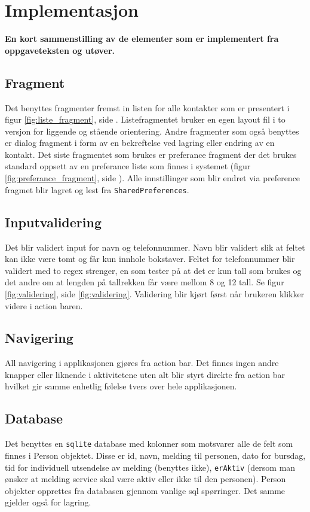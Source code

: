 \chapter{Implementasjon}

\textbf{En kort sammenstilling av de elementer som er implementert fra oppgaveteksten og utøver.}

\section{Fragment}
Det benyttes fragmenter fremst in listen for alle kontakter som er presentert i figur \ref{fig:liste_fragment}, side \pageref{fig:liste_fragment}. Listefragmentet bruker en egen layout fil i to versjon for liggende og stående orientering.
Andre fragmenter som også benyttes er dialog fragment i form av en bekreftelse ved lagring eller endring av en kontakt. 
Det siste fragmentet som brukes er preferance fragment der det brukes standard oppsett av en preferance liste som finnes i systemet (figur \ref{fig:preferance_fragment}, side \pageref{fig:preferance_fragment}). 
Alle innstillinger som blir endret via preference fragmet blir lagret og lest fra \texttt{SharedPreferences}.

\section{Inputvalidering}
Det blir validert input for navn og telefonnummer. Navn blir validert slik at feltet kan ikke være tomt og får kun innhole bokstaver. 
Feltet for telefonnummer blir validert med to regex strenger, en som tester på at det er kun tall som brukes og det andre om at lengden på tallrekken får være mellom 8 og 12 tall. Se figur \ref{fig:validering}, side \ref{fig:validering}. Validering blir kjørt først når brukeren klikker videre i action baren.  

\section{Navigering}
All navigering i applikasjonen gjøres fra action bar. Det finnes ingen andre knapper eller liknende i aktivitetene uten alt blir styrt direkte fra action bar hvilket gir samme enhetlig følelse tvers over hele applikasjonen. 

\section{Database}
Det benyttes en \texttt{sqlite} database med kolonner som motsvarer alle de felt som finnes i Person objektet. Disse er id, navn, melding til personen, dato for bursdag, tid for individuell utsendelse av melding (benyttes ikke), \texttt{erAktiv} (dersom man ønsker at melding service skal være aktiv eller ikke til den personen). Person objekter opprettes fra databasen gjennom vanlige sql spørringer. Det samme gjelder også for lagring. 


